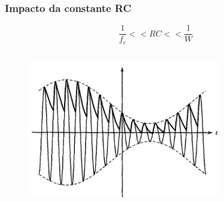 \documentclass[10pt,hyperref={pdfpagemode=FullScreen},aspectratio=169]{beamer}
\begin{document}
\begin{frame}
  \frametitle{Impacto da constante RC}

    $$
    \frac{1}{f_c} << RC << \frac{1}{W}
    $$
  

  \begin{columns}[T]
    \begin{column}{0.45\textwidth}
    \begin{figure}[!t]
      \begin{center}
        \includegraphics[width= 0.75\textwidth]{Fig/demod_am_conv_baixo_rc.png}  
      \end{center}
    \end{figure}
    

\end{column}
\end{columns}
\end{frame}
\end{document}

